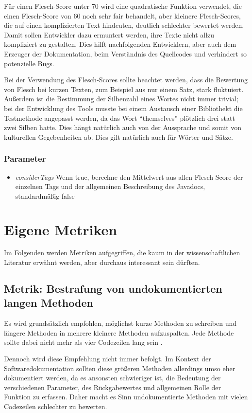 Für einen Flesch-Score unter 70 wird eine quadratische Funktion verwendet, die einen Flesch-Score von 60 noch sehr fair behandelt, aber kleinere Flesch-Scores, die auf einen komplizierten Text hindeuten, deutlich schlechter bewertet werden. Damit sollen Entwickler dazu ermuntert werden, ihre Texte nicht allzu kompliziert zu gestalten. Dies hilft nachfolgenden Entwicklern, aber auch dem Erzeuger der Dokumentation, beim Verständnis des Quellcodes und verhindert so potenzielle Bugs.

Bei der Verwendung des Flesch-Scores sollte beachtet werden, dass die Bewertung von Flesch bei kurzen Texten, zum Beispiel aus nur einem Satz, stark fluktuiert. Außerdem ist die Bestimmung der Silbenzahl eines Wortes nicht immer trivial; bei der Entwicklung des Tools musste bei einem Austausch einer Bibliothekt die Testmethode angepasst werden, da das Wort \enquote{themselves} plötzlich drei statt zwei Silben hatte. Dies hängt natürlich auch von der Aussprache und somit von kulturellen Gegebenheiten ab. Dies gilt natürlich auch für Wörter und Sätze. 
\subsubsection{Parameter}
\begin{itemize}
    \item \textit{considerTags} Wenn true, berechne den Mittelwert aus allen Flesch-Score der einzelnen Tags und der allgemeinen Beschreibung des Javadocs, standardmäßig false
\end{itemize}

 \section{Eigene Metriken}
 Im Folgenden werden Metriken aufgegriffen, die kaum in der wissenschaftlichen Literatur erwähnt werden, aber durchaus interessant sein dürften.
 \subsection{Metrik: Bestrafung von undokumentierten langen Methoden}
Es wird grundsätzlich empfohlen, möglichst kurze Methoden zu schreiben und längere Methoden in mehrere kleinere Methoden aufzuspalten. Jede Methode sollte dabei nicht mehr als vier Codezeilen lang sein \cite[S. 34]{martin2009clean}.
 
 Dennoch wird diese Empfehlung nicht immer befolgt. Im Kontext der Softwaredokumentation sollten diese größeren Methoden allerdings umso eher dokumentiert werden, da es ansonsten schwieriger ist, die Bedeutung der verschiedenen Parameter, des Rückgabewertes und allgemeinen Rolle der Funktion zu erfassen. Daher macht es Sinn undokumentierte Methoden mit vielen Codezeilen schlechter zu bewerten.
 
